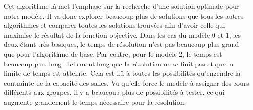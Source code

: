 Cet algorithme là met l'emphase sur la recherche d'une solution optimale pour notre modèle. Il va donc explorer beaucoup plus de solutions que tous les autres algorithmes et comparer toutes les solutions trouvées afin d'avoir celle qui maximise le résultat de la fonction objective. Dans les cas du modèle 0 et 1, les deux étant très basiques, le temps de résolution n'est pas beaucoup plus grand que pour l'algorithme de base. Par contre, pour le modèle 2, le temps est beaucoup plus long. Tellement long que la résolution ne se finit pas et que la limite de temps est atteinte. Cela est dû à toutes les possibilités qu'engendre la contrainte de la capacité des salles. Vu qu'elle force le modèle à assigner des cours différents aux groupes, il y a beaucoup plus de possibilités à tester, ce qui augmente grandement le temps nécessaire pour la résolution.

